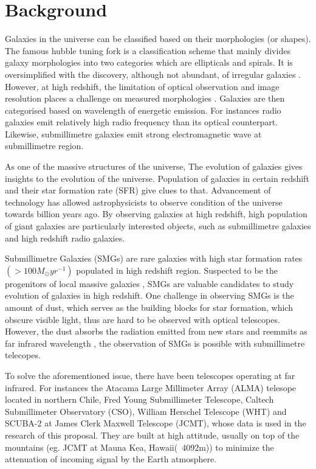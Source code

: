\documentclass{article}
\begin{document}
\section{Background}
Galaxies in the universe can be classified based on their morphologies (or shapes). The famous hubble tuning fork is a classification scheme that mainly divides galaxy morphologies into two categories which are ellipticals and spirals. It is oversimplified with the discovery, although not abundant, of irregular galaxies \parencite{Gallagher1984}. However, at high redshift, the limitation of optical observation and image resolution places a challenge on measured morphologies \parencite{Rouan2008}. Galaxies are then categorised based on wavelength of energetic emission. For instances radio galaxies emit relatively high radio frequency than its optical counterpart. Likewise, submillimetre galaxies emit strong electromagnetic wave at submillimetre region.
\medskip

\noindent As one of the massive structures of the universe, The evolution of galaxies gives insights to the evolution
of the universe. Population of galaxies in certain redshift and their star formation rate (SFR) give clues to that. Advancement of technology has allowed astrophysicists to observe condition of the universe towards billion years ago. By observing galaxies at high redshift, high population of giant galaxies are particularly interested objects, such as submillimetre galaxies and high redshift radio galaxies. 

\noindent Submillimetre Galaxies (SMGs) are rare galaxies with high star formation rates $(>100M_\odot yr^{-1})$ \parencite{DaCunha2021} populated in high redshift region. Suspected to be the progenitors of local massive galaxies \parencite{Casey2014}, SMGs are valuable candidates to study evolution of galaxies in high redshift. One challenge in observing SMGs is the amount of dust, which serves as the building blocks for star formation, which obscure visible light, thus are hard to be observed with optical telescopes. However, the dust absorbs the radiation emitted from new stars and reemmits as far infrared wavelength \parencite{Casey2014}, the observation of SMGs is possible with submillimetre telecopes. 
\medskip

\noindent To solve the aforementioned issue, there have been telescopes operating at far infrared. For instances the Atacama Large Millimeter Array (ALMA) telesope located in northern Chile, Fred Young Submillimeter Telescope, Caltech Submillimeter Observatory (CSO), William Herschel Telescope (WHT)\parencite{Phillips2013} and SCUBA-2 at James Clerk Maxwell Telescope (JCMT), whose data is used in the research of this proposal. They are built at high attitude, usually on top of the mountains (eg. JCMT at Mauna Kea, Hawaii(~4092m)) to minimize the attenuation of incoming signal by the Earth atmosphere.\parencite{Phillips2013}
\medskip
\end{document}
